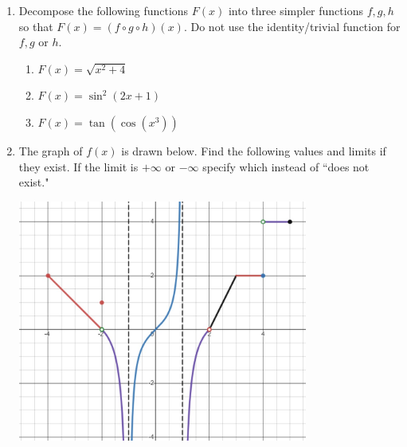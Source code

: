\documentclass[12pt]{article}
\begin{document}
 
\begin{enumerate}
    \item Decompose the following functions $F(x)$ into three simpler functions $f,g,h$ so that $F(x) = (f\circ g\circ h)(x)$. Do not use the identity/trivial function for $f,g$ or $h$.
    \begin{enumerate}
        \item $F(x) = \sqrt{x^2+4}$
        \vfill
        \item $F(x) = \sin^2(2x+1)$
        \vfill
        \item $F(x) = \tan(\cos(x^3))$
        \vfill
    
    \end{enumerate}
\pagebreak
    
    \item The graph of $f(x)$ is drawn below. Find the following values and limits if they exist. If the limit is $+\infty$ or $-\infty$ specify which  instead of ``does not exist."

    \begin{center}
        \includegraphics[width=0.75\textwidth]{Images/WS2pic2.jpeg}
    \end{center}


\end{enumerate}
\end{document}
